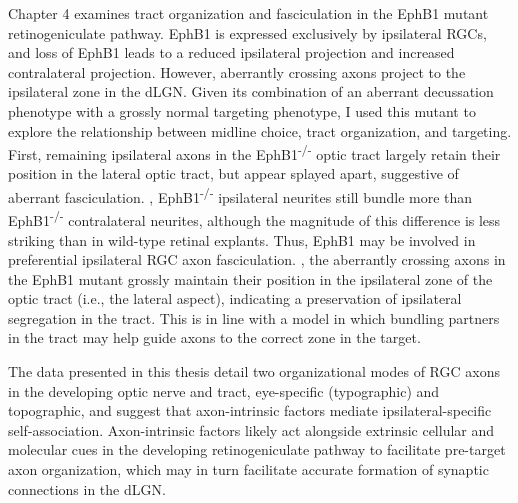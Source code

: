 Chapter 4 examines tract organization and fasciculation in the EphB1 mutant retinogeniculate pathway.
EphB1 is expressed exclusively by ipsilateral RGCs, and loss of EphB1 leads to a reduced ipsilateral projection and increased contralateral projection.
However, aberrantly crossing axons project to the ipsilateral zone in the dLGN.
Given its combination of an aberrant decussation phenotype with a grossly normal targeting phenotype, I used this mutant to explore the relationship between midline choice, tract organization, and targeting.
First, remaining ipsilateral axons in the EphB1\textsuperscript{-/-} optic tract largely retain their position in the lateral optic tract, but appear splayed apart, suggestive of aberrant fasciculation.
\Invitro{}, EphB1\textsuperscript{-/-} ipsilateral neurites still bundle more than EphB1\textsuperscript{-/-} contralateral neurites, although the magnitude of this difference is less striking than in wild-type retinal explants.
Thus, EphB1 may be involved in preferential ipsilateral RGC axon fasciculation.
\Invivo{}, the aberrantly crossing axons in the EphB1 mutant grossly maintain their position in the ipsilateral zone of the optic tract (i.e., the lateral aspect), indicating a preservation of ipsilateral segregation in the tract.
This is in line with a model in which bundling partners in the tract may help guide axons to the correct zone in the target.

The data presented in this thesis detail two organizational modes of RGC axons in the developing optic nerve and tract, eye-specific (typographic) and topographic, and suggest that axon-intrinsic factors mediate ipsilateral-specific self-association.
Axon-intrinsic factors likely act alongside extrinsic cellular and molecular cues in the developing retinogeniculate pathway to facilitate pre-target axon organization, which may in turn facilitate accurate formation of synaptic connections in the dLGN.